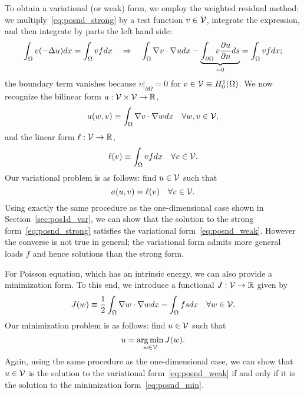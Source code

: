 To obtain a variational (or weak) form, we employ the weighted residual method: we multiply~\eqref{eq:posnd_strong} by a test function $v \in \mathcal{V}$, integrate the expression, and then integrate by parts the left hand side:
\begin{equation*}
  \int_\Omega v (-\Delta u) dx = \int_\Omega v f dx \quad \Rightarrow \quad
  \int_\Omega \nabla v \cdot \nabla u dx - \underbrace{ \int_{\partial \Omega} v \frac{\partial u}{\partial n} ds}_{ = 0}  = \int_\Omega v f dx;
\end{equation*}
the boundary term vanishes because $v|_{\partial \Omega} = 0$ for $v \in \mathcal{V} \equiv H^1_0(\Omega)$.  We now recognize the bilinear form $a: \mathcal{V} \times \mathcal{V} \to \mathbb{R}$,
\begin{equation*}
  a(w,v) \equiv \int_\Omega \nabla v \cdot \nabla w dx \quad \forall w,v \in \mathcal{V},
\end{equation*}
and the linear form $\ell: \mathcal{V} \to \mathbb{R}$,
\begin{equation*}
  \ell(v) \equiv \int_\Omega v f dx \quad \forall v \in \mathcal{V}.
\end{equation*}
Our variational problem is as follows: find $u \in \mathcal{V}$ such that
\begin{equation}
  a(u,v) = \ell(v) \quad \forall v \in \mathcal{V}. \label{eq:posnd_weak}
\end{equation}
 Using exactly the same procedure as the one-dimensional case shown in Section~\ref{sec:pos1d_var}, we can show that the solution to the strong form~\eqref{eq:posnd_strong} satisfies the variational form~\eqref{eq:posnd_weak}.  However the converse is not true in general; the variational form admits more general loads $f$ and hence solutions than the strong form.

For Poisson equation, which has an intrinsic energy, we can also provide a minimization form.  To this end, we introduce a functional $J: \mathcal{V} \to \mathbb{R}$ given by
\begin{equation*}
  J(w) \equiv \frac{1}{2} \int_\Omega \nabla w \cdot \nabla w dx - \int_\Omega f s dx \quad \forall w \in \mathcal{V}.
\end{equation*}
Our minimization problem is as follows: find $u \in \mathcal{V}$ such that
\begin{equation}
  u = \operatorname*{arg\,min}_{w \in \mathcal{V}} J(w). \label{eq:posnd_min}
\end{equation}
Again, using the same procedure as the one-dimensional case, we can show that $u \in \mathcal{V}$ is the solution to the variational form~\eqref{eq:posnd_weak} if and only if it is the solution to the minimization form~\eqref{eq:posnd_min}.

